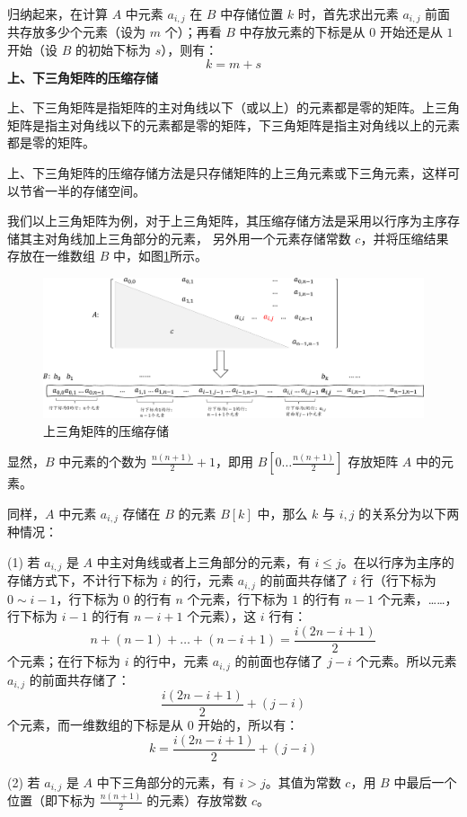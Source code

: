 \documentclass[lang=cn,newtx,10pt,scheme=chinese]{../elegantbook}
\begin{document}
归纳起来，在计算 $A$ 中元素 $a_{i,j}$ 在 $B$ 中存储位置 $k$ 时，首先求出元素 $a_{i,j}$ 前面共存放多少个元素（设为 $m$ 个）；再看 $B$ 中存放元素的下标是从 $0$ 开始还是从 $1$ 开始（设 $B$ 的初始下标为 $s$），则有：
\[
k = m + s
\]
\textbf{上、下三角矩阵的压缩存储}

上、下三角矩阵是指矩阵的主对角线以下（或以上）的元素都是零的矩阵。上三角矩阵是指主对角线以下的元素都是零的矩阵，下三角矩阵是指主对角线以上的元素都是零的矩阵。

上、下三角矩阵的压缩存储方法是只存储矩阵的上三角元素或下三角元素，这样可以节省一半的存储空间。

我们以上三角矩阵为例，对于上三角矩阵，其压缩存储方法是采用以行序为主序存储其主对角线加上三角部分的元素，
另外用一个元素存储常数 $c$，并将压缩结果存放在一维数组 $B$ 中，如图\ref{fig:upperMatrix}所示。

\begin{figure}[!htbp]
  \centering
  \includegraphics[width=1\textwidth]{./figure/pdf/cropped/upperMatrix.pdf}
  \caption{上三角矩阵的压缩存储}
  \label{fig:upperMatrix}
\end{figure}
显然，$B$ 中元素的个数为 $\frac{n(n+1)}{2} + 1$，即用 $B[0 \dots \frac{n(n+1)}{2}]$ 存放矩阵 $A$ 中的元素。

同样，$A$ 中元素 $a_{i,j}$ 存储在 $B$ 的元素 $B[k]$ 中，那么 $k$ 与 $i,j$ 的关系分为以下两种情况：

(1) 若 $a_{i,j}$ 是 $A$ 中主对角线或者上三角部分的元素，有 $i \leq j$。在以行序为主序的存储方式下，不计行下标为 $i$ 的行，元素 $a_{i,j}$ 的前面共存储了 $i$ 行（行下标为 $0 \sim i-1$，行下标为 $0$ 的行有 $n$ 个元素，行下标为 $1$ 的行有 $n-1$ 个元素，……，行下标为 $i-1$ 的行有 $n-i+1$ 个元素），这 $i$ 行有：
\[
n + (n-1) + \dots + (n-i+1) = \frac{i(2n-i+1)}{2}
\]
个元素；在行下标为 $i$ 的行中，元素 $a_{i,j}$ 的前面也存储了 $j-i$ 个元素。所以元素 $a_{i,j}$ 的前面共存储了：
\[
\frac{i(2n-i+1)}{2} + (j-i)
\]
个元素，而一维数组的下标是从 $0$ 开始的，所以有：
\[
k = \frac{i(2n-i+1)}{2} + (j-i)
\]

(2) 若 $a_{i,j}$ 是 $A$ 中下三角部分的元素，有 $i > j$。其值为常数 $c$，用 $B$ 中最后一个位置（即下标为 $\frac{n(n+1)}{2}$ 的元素）存放常数 $c$。
\end{document}
